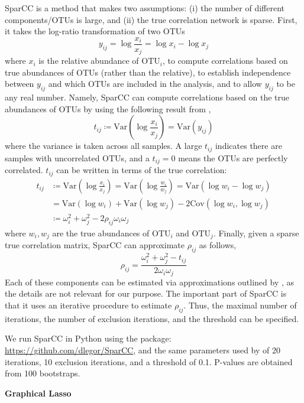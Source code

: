 \documentclass[12pt,letterpaper]{article}
\begin{document}
SparCC is a method that makes two assumptions: (i) the number of different components/OTUs is large, and (ii) the true correlation network is sparse. First, it takes the log-ratio transformation of two OTUs $$y_{ij} = \log \frac{x_i}{x_j} = \log x_i - \log x_j$$ where $x_i$ is the relative abundance of $\text{OTU}_i$, to compute correlations based on true abundances of OTUs (rather than the relative), to establish independence between $y_{ij}$ and which OTUs are included in the analysis, and to allow $y_{ij}$ to be any real number. Namely, SparCC can compute correlations based on the true abundances of OTUs by using the following result from \citep{aitchison1982compositional}, $$t_{ij} \coloneq \text{Var}\left(\log \frac{x_i}{x_j}\right) = \text{Var} (y_{ij})$$ where the variance is taken across all samples. A large $t_{ij}$ indicates there are samples with uncorrelated OTUs, and a $t_{ij} = 0$ means the OTUs are perfectly correlated. $t_{ij}$ can be written in terms of the true correlation: 
\begin{align*}
	t_{ij} &\coloneq \text{Var}\left(\log \frac{x_i}{x_j}\right) = \text{Var}\left(\log \frac{w_i}{w_j}\right) = \text{Var} (\log w_i - \log w_j) \\
	&= \text{Var} (\log w_i) + \text{Var} (\log w_j) - 2 \text{Cov}(\log w_i, \log w_j) \\
	&\coloneq \omega_i^2 + \omega_j^2 - 2 \rho_{ij}\omega_i\omega_j
\end{align*}
where $w_i, w_j$ are the true abundances of $\text{OTU}_i$ and $\text{OTU}_j$. Finally, given a sparse true correlation matrix, SparCC can approximate $\rho_{ij}$ as follows, $$\rho_{ij} = \frac{\omega_i^2 + \omega_j^2 - t_{ij}}{2\omega_i\omega_j}$$ Each of these components can be estimated via approximations outlined by \citep{friedman2012sparcc}, as the details are not relevant for our purpose. The important part of SparCC is that it uses an iterative procedure to estimate $\rho_{ij}$. Thus, the maximal number of iterations, the number of exclusion iterations, and the threshold can be specified.

We run SparCC in Python using the package: \url{https://github.com/dlegor/SparCC}, and the same parameters used by \citep{friedman2012sparcc, zhou2019t2d} of 20 iterations, 10 exclusion iterations, and a threshold of 0.1. P-values are obtained from 100 bootstraps. \newline

\textbf{Graphical Lasso}
\end{document}
